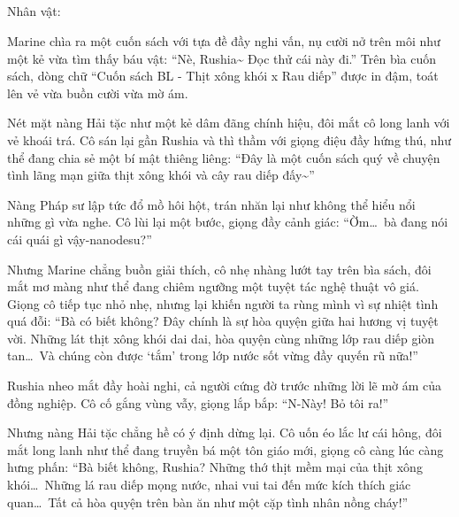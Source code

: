 \documentclass[../main.tex]{subfiles}
\begin{document}
\subsection*{\label{ep-S13.I}}
\begin{center}
  {\caviar\fontsize{12pt}{12pt}\selectfont Nhân vật:  }
\end{center}

Marine chìa ra một cuốn sách với tựa đề đầy nghi vấn, nụ cười nở trên môi như một kẻ vừa tìm thấy báu vật: ``Nè, Rushia\~{} Đọc thử cái này đi.'' Trên bìa cuốn sách, dòng chữ ``Cuốn sách BL - Thịt xông khói x Rau diếp'' được in đậm, toát lên vẻ vừa buồn cười vừa mờ ám.


Nét mặt nàng Hải tặc như một kẻ dâm đãng chính hiệu, đôi mắt cô long lanh với vẻ khoái trá. Cô sán lại gần Rushia và thì thầm với giọng điệu đầy hứng thú, như thể đang chia sẻ một bí mật thiêng liêng: ``Đây là một cuốn sách quý về chuyện tình lãng mạn giữa thịt xông khói và cây rau diếp đấy\~{}''

Nàng Pháp sư lập tức đổ mồ hôi hột, trán nhăn lại như không thể hiểu nổi những gì vừa nghe. Cô lùi lại một bước, giọng đầy cảnh giác: ``Ờm\dots\ bà đang nói cái quái gì vậy-nanodesu?''

Nhưng Marine chẳng buồn giải thích, cô nhẹ nhàng lướt tay trên bìa sách, đôi mắt mơ màng như thể đang chiêm ngưỡng một tuyệt tác nghệ thuật vô giá. Giọng cô tiếp tục nhỏ nhẹ, nhưng lại khiến người ta rùng mình vì sự nhiệt tình quá đỗi: ``Bà có biết không? Đây chính là sự hòa quyện giữa hai hương vị tuyệt vời. Những lát thịt xông khói dai dai, hòa quyện cùng những lớp rau diếp giòn tan\dots\ Và chúng còn được `tắm' trong lớp nước sốt vừng đầy quyến rũ nữa!''

Rushia nheo mắt đầy hoài nghi, cả người cứng đờ trước những lời lẽ mờ ám của đồng nghiệp. Cô cố gắng vùng vẫy, giọng lắp bắp: ``N-Này! Bỏ tôi ra!''

Nhưng nàng Hải tặc chẳng hề có ý định dừng lại. Cô uốn éo lắc lư cái hông, đôi mắt long lanh như thể đang truyền bá một tôn giáo mới, giọng cô càng lúc càng hưng phấn: ``Bà biết không, Rushia? Những thớ thịt mềm mại của thịt xông khói\dots\ Những lá rau diếp mọng nước, nhai vui tai đến mức kích thích giác quan\dots\ Tất cả hòa quyện trên bàn ăn như một cặp tình nhân nồng cháy!''

\end{document}
